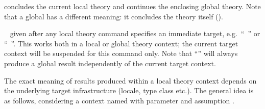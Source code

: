 \begin{isabellebody}
\begin{isamarkuptext}
\begin{description}
  \item \hyperlink{command.local.end}{\mbox{}} concludes the current local theory
  and continues the enclosing global theory.  Note that a global
  \hyperlink{command.global.end}{\mbox{}} has a different meaning: it concludes the
  theory itself ().
  
  \item {}\hypertarget{keyword.in}{\hyperlink{keyword.in}{\mbox{}}}~ given after any
  local theory command specifies an immediate target, e.g.\
  ``\hyperlink{command.definition}{\mbox{}}~'' or ``\hyperlink{command.theorem}{\mbox{}}~''.  This works both in a local or
  global theory context; the current target context will be suspended
  for this command only.  Note that ``'' will
  always produce a global result independently of the current target
  context.

  \end{description}

  The exact meaning of results produced within a local theory context
  depends on the underlying target infrastructure (locale, type class
  etc.).  The general idea is as follows, considering a context named
  \isa{c} with parameter \isa{x} and assumption .
  

\end{isamarkuptext}
\end{isabellebody}
